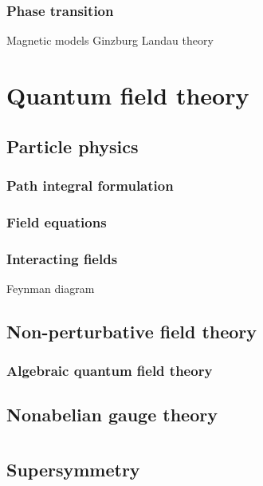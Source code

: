 \documentclass{../note}
\begin{document}
\section{Phase transition}
Magnetic models
Ginzburg Landau theory







\part{Quantum field theory}
\chapter{Particle physics}
\section{Path integral formulation}
\section{Field equations}
\section{Interacting fields}
Feynman diagram

\chapter{Non-perturbative field theory}
\section{Algebraic quantum field theory}

\chapter{Nonabelian gauge theory}





\part{}
\chapter{Supersymmetry}
\end{document}
